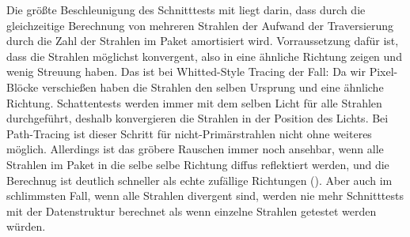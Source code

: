 Die größte Beschleunigung des Schnitttests mit  liegt darin, dass durch die gleichzeitige Berechnung von mehreren Strahlen der Aufwand der Traversierung durch die Zahl der Strahlen im Paket amortisiert wird. Vorraussetzung dafür ist, dass die Strahlen möglichst konvergent, also in eine ähnliche Richtung zeigen und wenig Streuung haben. Das ist bei Whitted-Style Tracing der Fall: Da wir Pixel-Blöcke verschießen haben die Strahlen den selben Ursprung und eine ähnliche Richtung. Schattentests werden immer mit dem selben Licht für alle Strahlen durchgeführt, deshalb konvergieren die Strahlen in der Position des Lichts. Bei Path-Tracing ist dieser Schritt für nicht-Primärstrahlen nicht ohne weiteres möglich. Allerdings ist das gröbere Rauschen immer noch ansehbar, wenn alle Strahlen im Paket in die selbe selbe Richtung diffus reflektiert werden, und die Berechnug ist deutlich schneller als echte zufällige Richtungen (). Aber auch im schlimmsten Fall, wenn alle Strahlen divergent sind, werden nie mehr Schnitttests mit der Datenstruktur berechnet als wenn einzelne Strahlen getestet werden würden.
